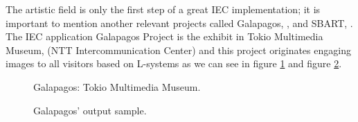 The artistic field is only the first step of a great IEC implementation; it is
important to mention another relevant projects called Galapagos,
\cite{sims1997interactivity}, and SBART, \cite{unemi2000sbart}. The IEC
application Galapagos Project is the exhibit in Tokio Multimedia Museum, (NTT
Intercommunication Center) and this project originates engaging images to all
visitors based on L-systems as we can see in figure \ref{fig:Galapagos1} and
figure \ref{fig:Galapagos2}.

\begin{figure}
\captionsetup{justification=centering,margin=2cm}
\centering
\setlength\fboxsep{0pt}
\setlength\fboxrule{0.7pt}
\caption{Galapagos: Tokio Multimedia Museum.}
\label{fig:Galapagos1}
\end{figure}

\begin{figure}
\captionsetup{justification=centering,margin=2cm}
\centering
\setlength\fboxsep{0pt}
\setlength\fboxrule{0.7pt}
\caption{Galapagos' output sample.}
\label{fig:Galapagos2}
\end{figure}


